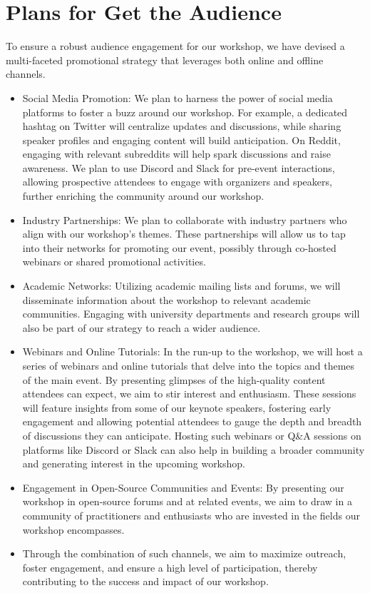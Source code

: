 \documentclass[10pt]{article} %
\newcounter{exa}
\begin{document}
\section{Plans for Get the Audience}
To ensure a robust audience engagement for our workshop, we have devised a multi-faceted promotional strategy that leverages both online and offline channels.
\begin{itemize}
    \item Social Media Promotion: We plan to harness the power of social media platforms to foster a buzz around our workshop. For example, a dedicated hashtag on Twitter will centralize updates and discussions, while sharing speaker profiles and engaging content will build anticipation. On Reddit, engaging with relevant subreddits will help spark discussions and raise awareness. We plan to use Discord and Slack for pre-event interactions, allowing prospective attendees to engage with organizers and speakers, further enriching the community around our workshop.
    \item Industry Partnerships: We plan to collaborate with industry partners who align with our workshop's themes. These partnerships will allow us to tap into their networks for promoting our event, possibly through co-hosted webinars or shared promotional activities.
    \item Academic Networks: Utilizing academic mailing lists and forums, we will disseminate information about the workshop to relevant academic communities. Engaging with university departments and research groups will also be part of our strategy to reach a wider audience.
    \item Webinars and Online Tutorials: In the run-up to the workshop, we will host a series of webinars and online tutorials that delve into the topics and themes of the main event. By presenting glimpses of the high-quality content attendees can expect, we aim to stir interest and enthusiasm. These sessions will feature insights from some of our keynote speakers, fostering early engagement and allowing potential attendees to gauge the depth and breadth of discussions they can anticipate. Hosting such webinars or Q\&A sessions on platforms like Discord or Slack can also help in building a broader community and generating interest in the upcoming workshop.
    \item Engagement in Open-Source Communities and Events: By presenting our workshop in open-source forums and at related events, we aim to draw in a community of practitioners and enthusiasts who are invested in the fields our workshop encompasses.
    \item Through the combination of such channels, we aim to maximize outreach, foster engagement, and ensure a high level of participation, thereby contributing to the success and impact of our workshop.
    
\end{itemize}
\end{document}
